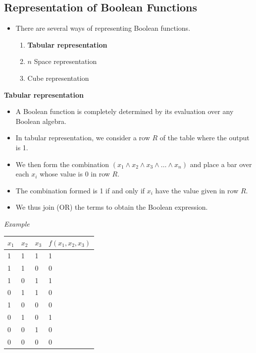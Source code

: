 \documentclass[]{book}
\providecommand{\tightlist}{%
  \setlength{\itemsep}{0pt}\setlength{\parskip}{0pt}}
\begin{document}
\hypertarget{representation-of-boolean-functions}{%
\subsection{Representation of Boolean Functions}\label{representation-of-boolean-functions}}

\begin{itemize}
\item
  There are several ways of representing Boolean functions.

  \begin{enumerate}
  \def\labelenumi{(\alph{enumi})}
  \tightlist
  \item
    \textbf{Tabular representation}
  \item
    \(n\) Space representation
  \item
    Cube representation
  \end{enumerate}
\end{itemize}

\textbf{Tabular representation}

\begin{itemize}
\tightlist
\item
  A Boolean function is completely determined by its evaluation over any Boolean algebra.
\item
  In tabular representation, we consider a row \(R\) of the table where the output is 1.
\item
  We then form the combination \((x_1 \land x_2 \land x_3 \land \dots \land x_n)\) and place a bar over each \(x_i\) whose value is 0 in row \(R\).
\item
  The combination formed is 1 if and only if \(x_i\) have the value given in row \(R\).
\item
  We thus join (OR) the terms to obtain the Boolean expression.
\end{itemize}

\newpage

\emph{Example}

\begin{longtable}[]{@{}llll@{}}
\toprule
\(x_1\) & \(x_2\) & \(x_3\) & \(f(x_1, x_2, x_3)\)\tabularnewline
\midrule
\endhead
1 & 1 & 1 & 1\tabularnewline
1 & 1 & 0 & 0\tabularnewline
1 & 0 & 1 & 1\tabularnewline
0 & 1 & 1 & 0\tabularnewline
1 & 0 & 0 & 0\tabularnewline
0 & 1 & 0 & 1\tabularnewline
0 & 0 & 1 & 0\tabularnewline
0 & 0 & 0 & 0\tabularnewline
\bottomrule
\end{longtable}
\end{document}
